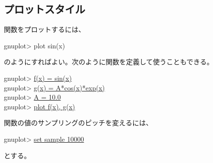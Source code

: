 {\subsection{プロットスタイル}
関数をプロットするには、
\begin{commandline2}
gnuplot> plot sin(x)
\end{commandline2} \noindent
のようにすればよい。次のように関数を定義して使うこともできる。
\begin{commandline2}
gnuplot> \underline{f(x) = sin(x)} \\
gnuplot> \underline{g(x) = A*cos(x)*exp(x)} \\
gnuplot> \underline{A = 10.0} \\
gnuplot> \underline{plot f(x), g(x)}
\end{commandline2} \noindent
関数の値のサンプリングのピッチを変えるには、
\begin{commandline2}
gnuplot> \underline{set sample 10000}
\end{commandline2} \noindent
とする。

}
